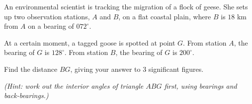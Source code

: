\begin{question}
\noindent An environmental scientist is tracking the migration of a flock of geese. She sets up two observation stations, $A$ and $B$, on a flat coastal plain, where $B$ is $18$ km from $A$ on a bearing of $072^\circ$.

At a certain moment, a tagged goose is spotted at point $G$. From station $A$, the bearing of $G$ is $128^\circ$. From station $B$, the bearing of $G$ is $200^\circ$.

Find the distance $BG$, giving your answer to 3 significant figures.

\vspace{0.3cm}
\noindent \textit{(Hint: work out the interior angles of triangle $ABG$ first, using bearings and back-bearings.)}

\vspace{7cm}

\begin{flushright}
\end{flushright}
\end{question}
